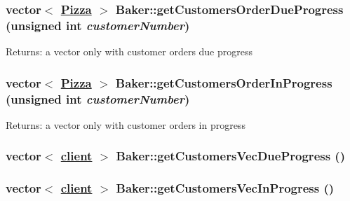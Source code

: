 \hypertarget{class_baker_7c9256e53372bd3a698e40cf64003c50}{
\subsubsection[getCustomersOrderDueProgress]{\setlength{\rightskip}{0pt plus 5cm}vector$<$ \hyperlink{class_pizza}{Pizza} $>$ Baker::get\-Customers\-Order\-Due\-Progress (unsigned int {\em customer\-Number})}}
\label{class_baker_7c9256e53372bd3a698e40cf64003c50}


\begin{Desc}
\item[Returns:]a vector only with customer orders due progress \end{Desc}
\hypertarget{class_baker_96a7c1ec2dc23919a4e7ca8c399476e1}{
\subsubsection[getCustomersOrderInProgress]{\setlength{\rightskip}{0pt plus 5cm}vector$<$ \hyperlink{class_pizza}{Pizza} $>$ Baker::get\-Customers\-Order\-In\-Progress (unsigned int {\em customer\-Number})}}
\label{class_baker_96a7c1ec2dc23919a4e7ca8c399476e1}


\begin{Desc}
\item[Returns:]a vector only with customer orders in progress \end{Desc}
\hypertarget{class_baker_4c05936fa38e14b768511921a3288c57}{
\subsubsection[getCustomersVecDueProgress]{\setlength{\rightskip}{0pt plus 5cm}vector$<$ \hyperlink{classclient}{client} $>$ Baker::get\-Customers\-Vec\-Due\-Progress ()}}
\label{class_baker_4c05936fa38e14b768511921a3288c57}


\hypertarget{class_baker_8b798f098bfd9a23b11fa1d63d089609}{
\subsubsection[getCustomersVecInProgress]{\setlength{\rightskip}{0pt plus 5cm}vector$<$ \hyperlink{classclient}{client} $>$ Baker::get\-Customers\-Vec\-In\-Progress ()}}
\label{class_baker_8b798f098bfd9a23b11fa1d63d089609}


